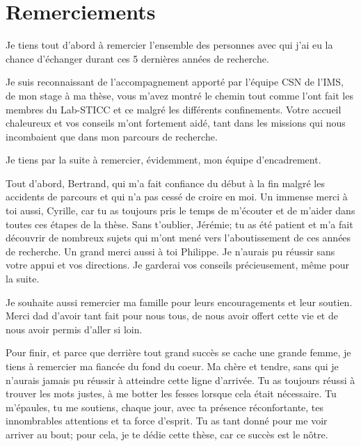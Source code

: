 \documentclass[../main.tex]{subfiles}
\begin{document}
\chapter*{Remerciements}


Je tiens tout d’abord à remercier l’ensemble des personnes avec qui j’ai eu la chance d’échanger durant ces 5 dernières années de recherche. 

Je suis reconnaissant de l’accompagnement apporté par l’équipe CSN de l’IMS, de mon stage à ma thèse, vous m’avez montré le chemin tout comme l’ont fait les membres du Lab-STICC et ce malgré les différents confinements. Votre accueil chaleureux et vos conseils m’ont fortement aidé, tant dans les missions qui nous incombaient que dans mon parcours de recherche. 

Je tiens par la suite à remercier, évidemment, mon équipe d’encadrement. 

Tout d’abord, Bertrand, qui m’a fait confiance du début à la fin malgré les accidents de parcours et qui n’a pas cessé de croire en moi. Un immense merci à toi aussi, Cyrille, car tu as toujours pris le temps de m’écouter et de m’aider dans toutes ces étapes de la thèse. Sans t’oublier, Jérémie; tu as été patient et m’a fait découvrir de nombreux sujets qui m’ont mené vers l’aboutissement de ces années de recherche. Un grand merci aussi à toi Philippe. Je n’aurais pu réussir sans votre appui et vos directions. Je garderai vos conseils précieusement, même pour la suite. 

Je souhaite aussi remercier ma famille pour leurs encouragements et leur soutien. Merci dad d’avoir tant fait pour nous tous, de nous avoir offert cette vie et de nous avoir permis d’aller si loin. 

Pour finir, et parce que derrière tout grand succès se cache une grande femme, je tiens à remercier ma fiancée du fond du coeur. Ma chère et tendre, sans qui je n’aurais jamais pu réussir à atteindre cette ligne d’arrivée. Tu as toujours réussi à trouver les mots justes, à me botter les fesses lorsque cela était nécessaire. Tu m’épaules, tu me soutiens, chaque jour, avec ta présence réconfortante, tes innombrables attentions et ta force d’esprit. Tu as tant donné pour me voir arriver au bout; pour cela, je te dédie cette thèse, car ce succès est le nôtre.
\end{document}
